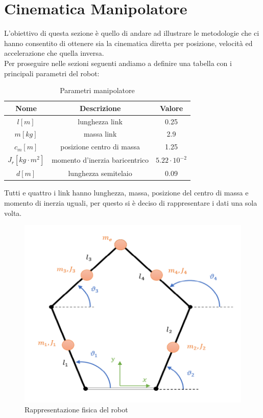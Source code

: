 \section{Cinematica Manipolatore}
L'obiettivo di questa sezione è quello di andare ad illustrare le metodologie che ci hanno consentito di ottenere sia la cinematica diretta per posizione, velocità ed accelerazione che quella inversa.
\\Per proseguire nelle sezioni seguenti andiamo a definire una tabella con i principali parametri del robot:
\begin{table}[h!]
\centering
\begin{tabular}{|c |c |c|} 
 \hline
 Nome & Descrizione  & Valore \\ [0.5ex] 
 \hline\hline
 $l [m]$ & lunghezza link  & 0.25 \\ 
 $m [kg]$ & massa link & 2.9 \\
 $c_m [m]$ & posizione centro di massa & 1.25 \\
 $J_r [kg\cdot m^2]$ & momento d'inerzia baricentrico & $5.22\cdot 10^{-2}$ \\
 $d [m]$ & lunghezza semitelaio & 0.09 \\
 \hline
\end{tabular}
\caption{Parametri manipolatore}
\label{table:1}
\end{table}
Tutti e quattro i link hanno lunghezza, massa, posizione del centro di massa e momento di inerzia uguali, per questo si è deciso di rappresentare i dati una sola volta.
\begin{figure}[ht]
\begin{center}
    \includegraphics[scale=0.5]{Immagini/Robot2.png}
    \caption{Rappresentazione fisica del robot}
\end{center}
\end{figure}
